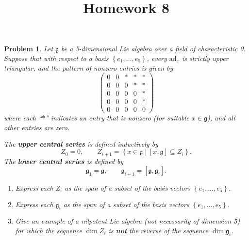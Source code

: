 \documentclass[11pt, letterpaper]{article}
\title{Homework 8}
\theoremstyle{plain}
\newtheorem{problem}{Problem}
\begin{document}
\makeproblem


\begin{problem}
	Let $\mathfrak{g} $ be a 5-dimensional Lie algebra over a field of characteristic 0. Suppose that with respect to a basis $\left\{ e_1, \ldots , e_5 \right\} $, every $\mathrm{ad} _x$ is strictly upper triangular, and the pattern of nonzero entries is given by
	\[
		\begin{pmatrix}
		0 & 0 & * & * & * \\
		0 & 0 & 0 & * & * \\
		0 & 0 & 0 & 0 & * \\
		0 & 0 & 0 & 0 & * \\
		0 & 0 & 0 & 0 & 0
		\end{pmatrix}
	\]
	where each ``$*$'' indicates an entry that is nonzero (for suitable $x\in \mathfrak{g} $), and all other entries are zero.

The \textbf{upper central series} is defined inductively by
\[
	Z_0 = 0,\qquad Z_{i+1} =\left\{ x\in \mathfrak{g} \mid [x,\mathfrak{g} ]\subseteq Z_i \right\} 
.\]
The \textbf{lower central series} is defined by
\[
	\mathfrak{g} _1 = \mathfrak{g} ,\qquad \mathfrak{g} _{i+1} =[\mathfrak{g} ,\mathfrak{g} _i]
.\]
\begin{enumerate}
	\item Express each $Z_i$ as the span of a subset of the basis vectors $\left\{ e_1, \ldots ,e_5 \right\} $.
	\item Express each $\mathfrak{g} _i$ as the span of a subset of the basis vectors $\left\{ e_1, \ldots ,e_5 \right\} $.
	\item Give an example of a nilpotent Lie algebra (not necessarily of dimension 5) for which the sequence $\dim Z_i$ is \textbf{not} the reverse of the sequence $\dim \mathfrak{g} _i$.
\end{enumerate}
\end{problem}
\end{document}
